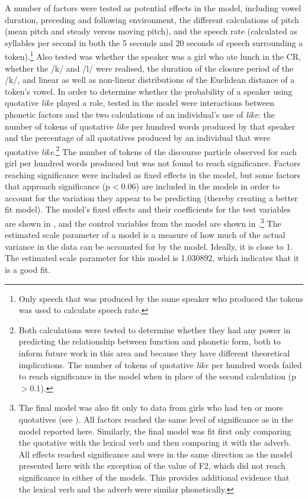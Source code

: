 A number of factors were tested as potential effects in the model, including vowel duration, preceding and following environment, the different calculations of pitch (mean pitch and steady versus moving pitch), and the speech rate (calculated as syllables per second in both the 5 seconds and 20 seconds of speech surrounding a token).\footnote{Only speech that was produced by the same speaker who produced the tokens was used to calculate speech rate.} Also tested was whether the speaker was a girl who ate lunch in the CR, whether the /k/ and /l/ were realised, the duration of the closure period of the /k/, and linear as well as non-linear distributions of the Euclidean distance of a token's vowel. In order to determine whether the probability of a speaker using quotative \textit{like} played a role, tested in the model were interactions between phonetic factors and the two calculations of an individual's use of \textit{like}: the number of tokens of quotative \textit{like} per hundred words produced by that speaker and the percentage of all quotatives produced by an individual that were quotative \textit{like}.\footnote{Both calculations were tested to determine whether they had any power in predicting the relationship between function and phonetic form, both to inform future work in this area and because they have different theoretical implications. The number of tokens of quotative \textit{like} per hundred words failed to reach significance in the model when in place of the second calculation (p$>$0.1).} The number of tokens of the discourse particle observed for each girl per hundred words produced but was not found to reach significance. Factors reaching significance were included as fixed effects in the model, but some factors that approach significance (p$<$0.06) are included in the models in order to account for the variation they appear to be predicting (thereby creating a better fit model). The model's fixed effects and their coefficients for the test variables are shown in , and the control variables from the model are shown in .\footnote{The final model was also fit only to data from girls who had ten or more quotatives (see ). All factors reached the same level of significance as in the model reported here. Similarly, the final model was fit first only comparing the quotative with the lexical verb and then comparing it with the adverb. All effects reached significance and were in the same direction as the model presented here with the exception of the value of F2, which did not reach significance in either of the models. This provides additional evidence that the lexical verb and the adverb were similar phonetically.} The estimated scale parameter of a model is a measure of how much of the actual variance in the data can be accounted for by the model. Ideally, it is close to 1. The estimated scale parameter for this model is 1.030892, which indicates that it is a good fit.
 

